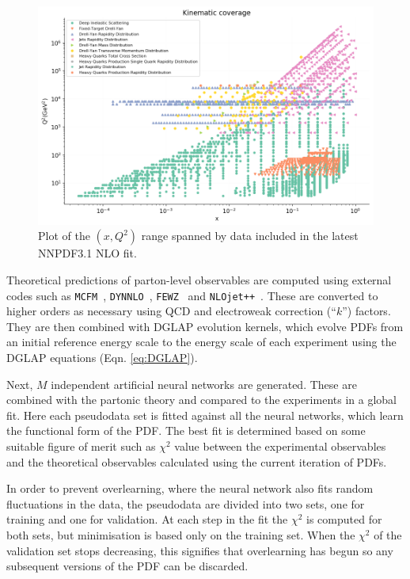 \begin{figure}
\centering
\includegraphics[width=15cm]{background/NNPDF31_nlo_as_0118_1000_markers0_fitcontext_plot_xq2.png}
\caption{Plot of the $(x,Q^2)$ range spanned by data included in the latest NNPDF3.1 NLO fit.}
\label{data}
\end{figure}

Theoretical predictions of parton-level observables are computed using external codes such as \texttt{MCFM}~\cite{jr:mcfm}, \texttt{DYNNLO}~\cite{Catani:2009sm}, \texttt{FEWZ}~\cite{Gavin:2010az} and \texttt{NLOjet++}~\cite{Catani:1996vz}. These are converted to higher orders as necessary using QCD and electroweak correction (``$k$'') factors. They are then combined with DGLAP evolution kernels, which evolve PDFs from an initial reference energy scale to the energy scale of each experiment using the DGLAP equations (Eqn. \ref{eq:DGLAP}). 

Next, $M$ independent artificial neural networks are generated. These are combined with the partonic theory and compared to the experiments in a global fit. Here each pseudodata set is fitted against all the neural networks, which learn the functional form of the PDF.  The best fit is determined based on some suitable figure of merit such as $\chi^2$ value between the experimental observables and the theoretical observables calculated using the current iteration of PDFs. 

In order to prevent overlearning, where the neural network also fits random fluctuations in the data, the pseudodata are divided into two sets, one for training and one for validation. At each step in the fit the $\chi^2$ is computed for both sets, but minimisation is based only on the training set. When the $\chi^2$ of the validation set stops decreasing, this signifies that overlearning has begun so any subsequent versions of the PDF can be discarded. 

